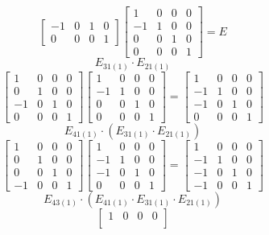 \documentclass[leqno]{article}
\begin{document}
\begin{enumerate}
\begin{sol}
$$\begin{bmatrix}
			-1 & 0 & 1 & 0 \\
			0 & 0 & 0 & 1 
		\end{bmatrix}
		\begin{bmatrix} 
			1 & 0 & 0 & 0 \\
			-1 & 1 & 0 & 0 \\
			0 & 0 & 1 & 0 \\
			0 & 0 & 0 & 1 
		\end{bmatrix} = E$$ 
		\newpage
		$$E_{31(1)} \cdot E_{21(1)}$$
		$$\begin{bmatrix}
			1 & 0 & 0 & 0\\
			0 & 1 & 0 & 0\\
			-1 & 0 & 1 & 0\\
			0 & 0 & 0 & 1
		\end{bmatrix}
		\begin{bmatrix}
			1 & 0 & 0 & 0\\
			-1 & 1 & 0 & 0\\
			0 & 0 & 1 & 0\\
			0 & 0 & 0 & 1
		\end{bmatrix} =
		\begin{bmatrix}
			1 & 0 & 0 & 0\\
			-1 & 1 & 0 & 0\\
			-1 & 0 & 1 & 0\\
			0 & 0 & 0 & 1
		\end{bmatrix}$$
		$$E_{41(1)} \cdot (E_{31(1)} \cdot E_{21(1)})$$
		$$\begin{bmatrix}
			1 & 0 & 0 & 0\\
			0 & 1 & 0 & 0\\
			0 & 0 & 1 & 0\\
			-1 & 0 & 0 & 1
		\end{bmatrix}
		\begin{bmatrix}
			1 & 0 & 0 & 0\\
			-1 & 1 & 0 & 0\\
			-1 & 0 & 1 & 0\\
			0 & 0 & 0 & 1
		\end{bmatrix} =
		\begin{bmatrix}
			1 & 0 & 0 & 0\\
			-1 & 1 & 0 & 0\\
			-1 & 0 & 1 & 0\\
			-1 & 0 & 0 & 1
		\end{bmatrix}$$
		$$E_{43(1)} \cdot (E_{41(1)} \cdot E_{31(1)} \cdot E_{21(1)})$$
		$$\begin{bmatrix}
			1 & 0 & 0 & 0\\

\end{bmatrix}$$
\end{sol}
\end{enumerate}
\end{document}
